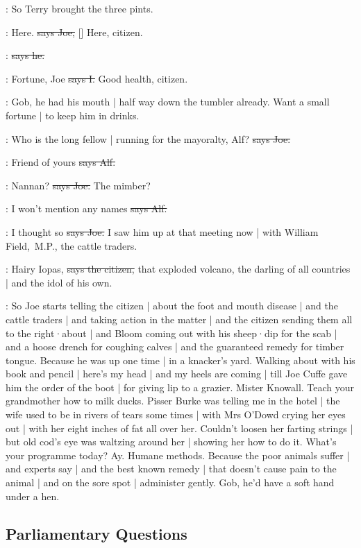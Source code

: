 \Nq:
So Terry brought the three pints.

\joe:
Here.
\sout{says Joe,}
[]
Here,
citizen.

\citizen:
\sout{says he.}

:
Fortune,
Joe
\sout{says I.}
Good health,
citizen.

\Nq:
Gob,
he had his mouth |
half way down the tumbler already.
Want a small fortune |
to keep him in drinks.

\joe:
Who is the long fellow |
running for the mayoralty,
Alf?
\sout{says Joe.}

\bergan:
Friend of yours
\sout{says Alf.}

\joe:
Nannan?
\sout{says Joe.}
The mimber?

\bergan:
I won't mention any names
\sout{says Alf.}

\joe:
I thought so
\sout{says Joe.}
I saw him up at that meeting now |
with William Field,~M.P.,
the cattle traders.

\citizen:
Hairy Iopas,
\sout{says the citizen,}
that exploded volcano,
the darling of all countries
 |
and the idol of his own.

\Nq:
So Joe starts telling the citizen |
about the foot and mouth disease |
and the cattle traders |
and taking action in the matter |
and the citizen sending them all to the right·about |
and Bloom coming out with his sheep·dip for the scab |
and a hoose drench for coughing calves |
and the guaranteed remedy for timber tongue.
Because he was up one time |
in a knacker's yard.
Walking about with his book and pencil |
here's my head |
and my heels are coming |
till Joe Cuffe gave him the order of the boot |
for giving lip to a grazier.
Mister Knowall.
Teach your grandmother how to milk ducks.
Pisser Burke was telling me in the hotel  |
the wife used to be in rivers of tears some times |
with Mrs O'Dowd crying her eyes out
 |
with her eight inches of fat all over her.
Couldn't loosen her farting strings |
but old cod's eye was waltzing around her |
showing her how to do it.
What's your programme today?
Ay.
Humane methods.
Because the poor animals suffer |
and experts say |
and the best known remedy |
that doesn't cause pain to the animal |
and on the sore spot |
administer gently.
Gob,
he'd have a soft hand under a hen.


\subsection*{Parliamentary Questions}

